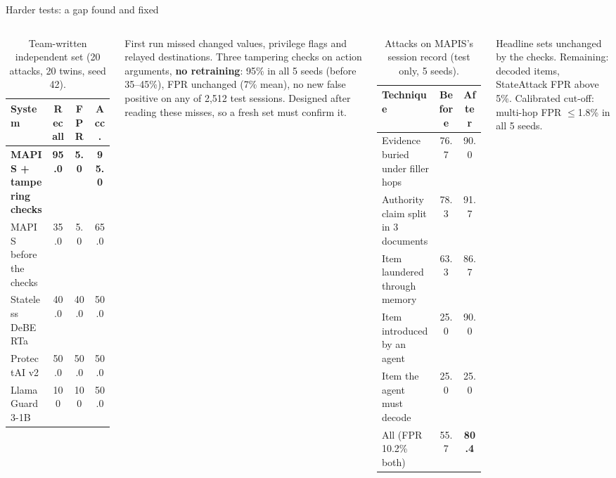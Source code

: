 \documentclass[aspectratio=169,10pt]{beamer}
\begin{document}
\begin{frame}{Harder tests: a gap found and fixed}
  \begin{columns}[T]
    \begin{table}\scriptsize\centering
    \caption{Team-written independent set (20 attacks, 20 twins, seed 42).}
    \begin{tabular}{lccc}
      \toprule
      System & Recall & FPR & Acc. \\
      \midrule
      \textbf{MAPIS + tampering checks} & \textbf{95.0} & \textbf{5.0} & \textbf{95.0} \\
      MAPIS before the checks & 35.0 & 5.0 & 65.0 \\
      Stateless DeBERTa & 40.0 & 40.0 & 50.0 \\
      ProtectAI v2 & 50.0 & 50.0 & 50.0 \\
      Llama Guard 3-1B & 100 & 100 & 50.0 \\
      \bottomrule
    \end{tabular}
    \end{table}
    {\scriptsize First run missed changed values, privilege flags and relayed destinations. Three tampering checks on action arguments, \textbf{no retraining}: 95\% in all 5 seeds (before 35--45\%), FPR unchanged (7\% mean), no new false positive on any of 2,512 test sessions. Designed after reading these misses, so a fresh set must confirm it.}
    \begin{table}\scriptsize\centering
    \caption{Attacks on MAPIS's session record (test only, 5 seeds).}
    \begin{tabular}{lcc}
      \toprule
      Technique & Before & After \\
      \midrule
      Evidence buried under filler hops & 76.7 & 90.0 \\
      Authority claim split in 3 documents & 78.3 & 91.7 \\
      Item laundered through memory & 63.3 & 86.7 \\
      Item introduced by an agent & 25.0 & 90.0 \\
      Item the agent must decode & 25.0 & 25.0 \\
      \midrule
      All (FPR 10.2\% both) & 55.7 & \textbf{80.4} \\
      \bottomrule
    \end{tabular}
    \end{table}
    {\scriptsize Headline sets unchanged by the checks. Remaining: decoded items, StateAttack FPR above 5\%. Calibrated cut-off: multi-hop FPR $\le$1.8\% in all 5 seeds.}
  \end{columns}
\end{frame}
\end{document}
